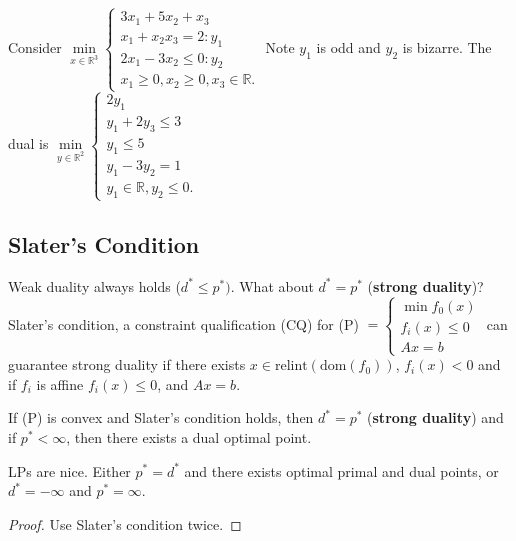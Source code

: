 \documentclass[english, 11pt]{article}
\begin{document}
\begin{exmp}
Consider $\min \limits_{x \in \mathbb{R}^3} 
\begin{cases} 3x_1 + 5x_2 + x_3 \\ x_1 + x_2 x_3 =2 :y_1 \\ 2x_1 - 3x_2 \le 0 : y_2 \\
x_1 \ge 0, x_2 \ge 0, x_3 \in \mathbb{R}. \end{cases}
$ Note $y_1$ is odd and $y_2$ is bizarre.
The dual is $\min \limits_{y \in \mathbb{R}^2} 
\begin{cases}
2 y_1 \\
 y_1 + 2 y_3 \le 3 \\
y_1 \le 5 \\
y_1 - 3y_2 =1 \\
y_1 \in \mathbb{R} , y_2 \le 0.
\end{cases}
$
\end{exmp}

\subsection{Slater's Condition}
Weak duality always holds ($d^* \le p^*)$. What about $d^* = p^*$ ({\bf strong duality})? Slater's condition, a constraint qualification (CQ) for (P)
$=\begin{cases} \min f_0(x) \\ f_i(x) \le 0 \\ Ax =b \end{cases}$ can guarantee strong duality if there exists $x \in \text{relint}(\text{dom}(f_0))$, $f_i(x) <0$ and if $f_i$ is affine $f_i(x) \le 0$, and $Ax=b$.

\begin{thrm}
If (P) is convex and Slater's condition holds, then $d^* = p^*$ ({\bf strong duality}) and if $p^* < \infty$, then there exists a dual optimal point.
\end{thrm}

\begin{thrm}
LPs are nice. Either $p^* = d^*$ and there exists optimal primal and dual points, or $d^* = -\infty$ and $p^* = \infty$. 
\end{thrm}
\begin{proof}
Use Slater's condition twice.
\end{proof}
\end{document}
